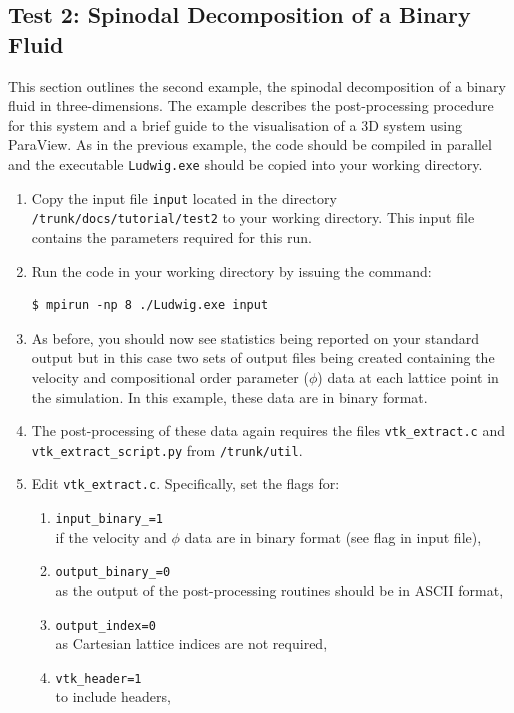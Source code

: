 \documentclass[11pt,twoside,a4paper]{article}
\begin{document}
\subsection{Test 2: Spinodal Decomposition of a Binary Fluid}

This section outlines the second example, the spinodal decomposition of a binary fluid in 
three-dimensions.
The example describes the post-processing procedure for this system and a brief guide to 
the visualisation of a 3D system using ParaView.
As in the previous example, the code should be compiled in parallel and the executable 
\texttt{Ludwig.exe} should be copied into your working directory.

\begin{enumerate}
\item Copy the input file \texttt{input} located in the directory 
\texttt{/trunk/docs/tutorial/test2} 
to your working directory. This input file contains the parameters required for this run. 
\item Run the code in your working directory by issuing the command:
\begin{lstlisting}
$ mpirun -np 8 ./Ludwig.exe input
\end{lstlisting}
\item As before, you should now see statistics being reported on your standard output but 
in this case two sets of output files being created containing the velocity and compositional
order parameter ($\phi$) data at each lattice point in the simulation. In this example, these 
data are in binary format.
\item The post-processing of these data again requires the files \texttt{vtk\_extract.c} 
and \texttt{vtk\_extract\_script.py} from \texttt{/trunk/util}.
\item Edit \texttt{vtk\_extract.c}. Specifically, set the flags for:
\begin{enumerate}
\item \texttt{input\_binary\_=1} \\ if the velocity and $\phi$ data are in binary format (see 
flag in input file),
\item \texttt{output\_binary\_=0} \\ as the output of the post-processing routines should be 
in ASCII format,
\item \texttt{output\_index=0} \\ as Cartesian lattice indices are not required, 
\item \texttt{vtk\_header=1} \\ to include headers,

\end{enumerate}
\end{enumerate}
\end{document}
